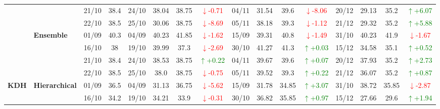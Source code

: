 {\begin{longtable}{llcc|cccc|cccc|cccc}
& 
& 21/10 & 38.4 & 24/10 & 38.04 & 38.75 & \textcolor{red}{\(\downarrow\)-0.71} & 04/11 & 31.54 & 39.6 & \textcolor{red}{\(\downarrow\)-8.06} & 20/12 & 29.13 & 35.2 & \textcolor{green}{\(\uparrow\)+6.07} \\

&
& 22/10 & 38.5 & 25/10 & 30.06 & 38.75 & \textcolor{red}{\(\downarrow\)-8.69} & 05/11 & 38.18 & 39.3 & \textcolor{red}{\(\downarrow\)-1.12} & 21/12 & 29.32 & 35.2 & \textcolor{green}{\(\uparrow\)+5.88} \\
\cmidrule(lr){2-16}


& \textbf{Ensemble}
& 01/09 & 40.3 & 04/09 & 40.23 & 41.85 & \textcolor{red}{\(\downarrow\)-1.62} & 15/09 & 39.31 & 40.8 & \textcolor{red}{\(\downarrow\)-1.49} & 31/10 & 40.23 & 41.9 & \textcolor{red}{\(\downarrow\)-1.67} \\

& 
& 16/10 & 38 & 19/10 & 39.99 & 37.3 & \textcolor{red}{\(\downarrow\)-2.69} & 30/10 & 41.27 & 41.3 & \textcolor{green}{\(\uparrow\)+0.03} & 15/12 & 34.58 & 35.1 & \textcolor{green}{\(\uparrow\)+0.52} \\

& 
& 21/10 & 38.4 & 24/10 & 38.53 & 38.75 & \textcolor{green}{\(\uparrow\)+0.22} & 04/11 & 39.67 & 39.6 & \textcolor{green}{\(\uparrow\)+0.07} & 20/12 & 37.93 & 35.2 & \textcolor{green}{\(\uparrow\)+2.73} \\

&
& 22/10 & 38.5 & 25/10 & 38.0 & 38.75 & \textcolor{red}{\(\downarrow\)-0.75} & 05/11 & 39.52 & 39.3 & \textcolor{green}{\(\uparrow\)+0.22} & 21/12 & 36.07 & 35.2 & \textcolor{green}{\(\uparrow\)+0.87} \\
\midrule



\multirow{12}{*}{\textbf{KDH}} 
& \textbf{Hierarchical}
& 01/09 & 36.5 & 04/09 & 31.13 & 36.75 & \textcolor{red}{\(\downarrow\)-5.62} & 15/09 & 31.78 & 34.85 & \textcolor{green}{\(\uparrow\)+3.07} & 31/10 & 38.72 & 35.85 & \textcolor{red}{\(\downarrow\)-2.87} \\

&
& 16/10 & 34.2 & 19/10 & 34.21 & 33.9 & \textcolor{red}{\(\downarrow\)-0.31} & 30/10 & 36.82 & 35.85 & \textcolor{green}{\(\uparrow\)+0.97} & 15/12 & 27.66 & 29.6 & \textcolor{green}{\(\uparrow\)+1.94} \\


\end{longtable}}
